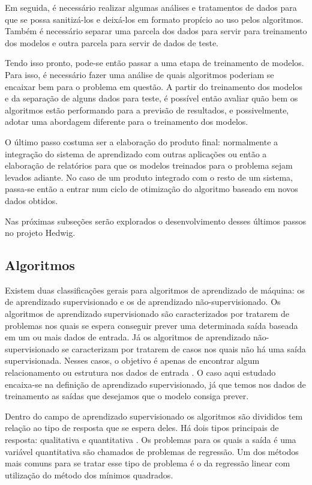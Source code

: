			Em seguida, é necessário realizar algumas análises e tratamentos de dados para que se possa sanitizá-los e deixá-los em formato propício ao uso pelos algoritmos. Também é necessário separar uma parcela dos dados para servir para treinamento dos modelos e outra parcela para servir de dados de teste.

			Tendo isso pronto, pode-se então passar a uma etapa de treinamento de modelos. Para isso, é necessário fazer uma análise de quais algoritmos poderiam se encaixar bem para o problema em questão. A partir do treinamento dos modelos e da separação de alguns dados para teste, é possível então avaliar quão bem os algoritmos estão performando para a previsão de resultados, e possivelmente, adotar uma abordagem diferente para o treinamento dos modelos.

			O último passo costuma ser a elaboração do produto final: normalmente a integração do sistema de aprendizado com outras aplicações ou então a elaboração de relatórios para que os modelos treinados para o problema sejam levados adiante. No caso de um produto integrado com o resto de um sistema, passa-se então a entrar num ciclo de otimização do algoritmo baseado em novos dados obtidos.

			Nas próximas subseções serão explorados o desenvolvimento desses últimos passos no projeto Hedwig.

		\subsection{Algoritmos}

			Existem duas classificações gerais para algoritmos de aprendizado de máquina: os de aprendizado supervisionado e os de aprendizado não-supervisionado. Os algoritmos de aprendizado supervisionado são caracterizados por tratarem de problemas nos quais se espera conseguir prever uma determinada saída baseada em um ou mais dados de entrada. Já os algoritmos de aprendizado não-supervisionado se caracterizam por tratarem de casos nos quais não há uma saída supervisionada. Nesses casos, o objetivo é apenas de encontrar algum relacionamento ou estrutura nos dados de entrada \cite{islr}. O caso aqui estudado encaixa-se na definição de aprendizado supervisionado, já que temos nos dados de treinamento as saídas que desejamos que o modelo consiga prever.

			Dentro do campo de aprendizado supervisionado os algoritmos são divididos tem relação ao tipo de resposta que se espera deles. Há dois tipos principais de resposta: qualitativa e quantitativa  \cite{islr}. Os problemas para os quais a saída é uma variável quantitativa são chamados de problemas de regressão. Um dos métodos mais comuns para se tratar esse tipo de problema é o da regressão linear com utilização do método dos mínimos quadrados.

